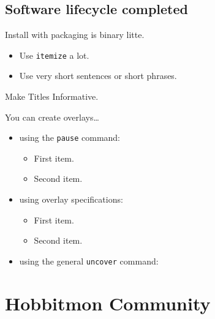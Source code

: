 \documentclass{beamer}
\begin{document}
\subsection[Softare Packaging and management ]{Software lifecycle completed}
\begin{frame}{Install with packaging is binary litte.}

  \begin{itemize}
  \item
    Use \texttt{itemize} a lot.
  \item
    Use very short sentences or short phrases.
  \end{itemize}
\end{frame}

\begin{frame}{Make Titles Informative.}

  You can create overlays\dots
  \begin{itemize}
  \item using the \texttt{pause} command:
    \begin{itemize}
    \item
      First item.
      \pause
    \item    
      Second item.
    \end{itemize}
  \item
    using overlay specifications:
    \begin{itemize}
    \item<3->
      First item.
    \item<4->
      Second item.
    \end{itemize}
  \item
    using the general \texttt{uncover} command:
    \begin{itemize}
    \end{itemize}
  \end{itemize}

\end{frame}


\section{Hobbitmon Community}
\end{document}
